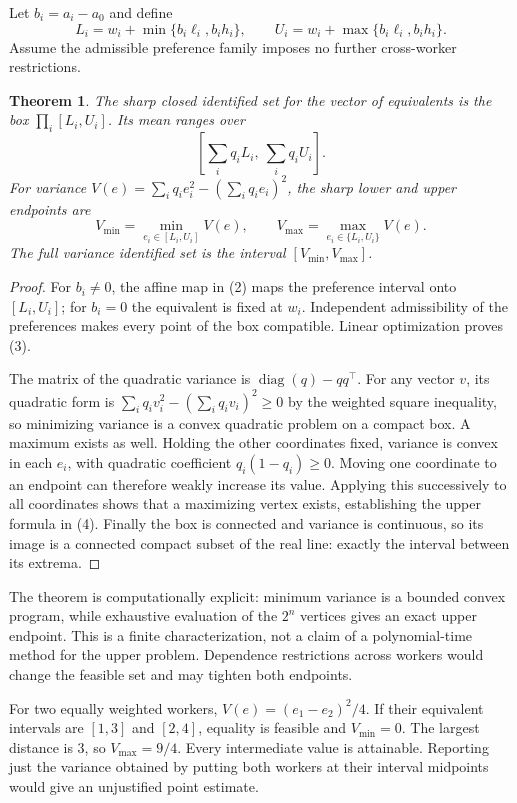 \documentclass[11pt,a4paper]{article}
\newtheorem{theorem}{Theorem}[section]
\begin{document}
Let $b_i=a_i-a_0$ and define
\[
 L_i=w_i+\min\{b_i\ell_i,b_ih_i\},\qquad
 U_i=w_i+\max\{b_i\ell_i,b_ih_i\}.
\]
Assume the admissible preference family imposes no further cross-worker restrictions.

\begin{theorem}
The sharp closed identified set for the vector of equivalents is the box
$\prod_i[L_i,U_i]$. Its mean ranges over
\[
 \left[\sum_iq_iL_i,\ \sum_iq_iU_i\right].
 \tag{3}
\]
For variance $V(e)=\sum_iq_ie_i^2-(\sum_iq_ie_i)^2$, the sharp lower and upper endpoints are
\[
 V_{\min}=\min_{e_i\in[L_i,U_i]}V(e),\qquad
 V_{\max}=\max_{e_i\in\{L_i,U_i\}}V(e).
 \tag{4}
\]
The full variance identified set is the interval $[V_{\min},V_{\max}]$.
\end{theorem}
\begin{proof}
For $b_i\ne0$, the affine map in (2) maps the preference interval onto $[L_i,U_i]$; for $b_i=0$ the equivalent is fixed at $w_i$. Independent admissibility of the preferences makes every point of the box compatible. Linear optimization proves (3).

The matrix of the quadratic variance is $\operatorname{diag}(q)-qq^\top$. For any vector $v$, its quadratic form is
$\sum_iq_iv_i^2-(\sum_iq_iv_i)^2\ge0$ by the weighted square inequality, so minimizing variance is a convex quadratic problem on a compact box. A maximum exists as well. Holding the other coordinates fixed, variance is convex in each $e_i$, with quadratic coefficient $q_i(1-q_i)\ge0$. Moving one coordinate to an endpoint can therefore weakly increase its value. Applying this successively to all coordinates shows that a maximizing vertex exists, establishing the upper formula in (4). Finally the box is connected and variance is continuous, so its image is a connected compact subset of the real line: exactly the interval between its extrema.
\end{proof}
The theorem is computationally explicit: minimum variance is a bounded convex program, while exhaustive evaluation of the $2^n$ vertices gives an exact upper endpoint. This is a finite characterization, not a claim of a polynomial-time method for the upper problem. Dependence restrictions across workers would change the feasible set and may tighten both endpoints.

For two equally weighted workers, $V(e)=(e_1-e_2)^2/4$. If their equivalent intervals are $[1,3]$ and $[2,4]$, equality is feasible and $V_{\min}=0$. The largest distance is $3$, so $V_{\max}=9/4$. Every intermediate value is attainable. Reporting just the variance obtained by putting both workers at their interval midpoints would give an unjustified point estimate.
\end{document}
